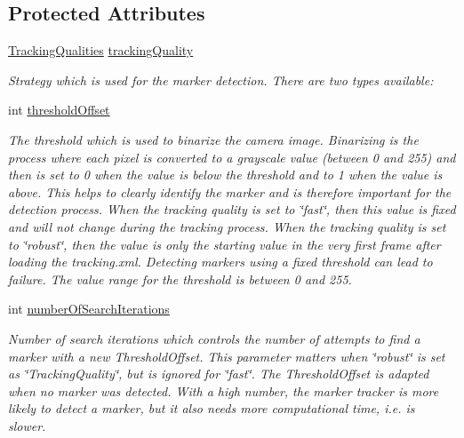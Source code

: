 \subsection*{Protected Attributes}
\begin{DoxyCompactItemize}
\item 
\hyperlink{class_a_rdev_kit_1_1_model_1_1_project_1_1_marker_sensor_adf403b5a2cee12e9f0006bd431cf569f}{Tracking\-Qualities} \hyperlink{class_a_rdev_kit_1_1_model_1_1_project_1_1_marker_sensor_af392037ccf5a8cf5e95ce42b0c768483}{tracking\-Quality}
\begin{DoxyCompactList}\small\item\em Strategy which is used for the marker detection. There are two types available\-: \end{DoxyCompactList}\item 
int \hyperlink{class_a_rdev_kit_1_1_model_1_1_project_1_1_marker_sensor_ad80a6fc2821f265fc4c0583d0a66dfa7}{threshold\-Offset}
\begin{DoxyCompactList}\small\item\em The threshold which is used to binarize the camera image. Binarizing is the process where each pixel is converted to a grayscale value (between 0 and 255) and then is set to 0 when the value is below the threshold and to 1 when the value is above. This helps to clearly identify the marker and is therefore important for the detection process. When the tracking quality is set to \char`\"{}fast\char`\"{}, then this value is fixed and will not change during the tracking process. When the tracking quality is set to \char`\"{}robust\char`\"{}, then the value is only the starting value in the very first frame after loading the tracking.\-xml. Detecting markers using a fixed threshold can lead to failure. The value range for the threshold is between 0 and 255. \end{DoxyCompactList}\item 
int \hyperlink{class_a_rdev_kit_1_1_model_1_1_project_1_1_marker_sensor_aaefe31873d64fdae7c9518487f0ad0d1}{number\-Of\-Search\-Iterations}
\begin{DoxyCompactList}\small\item\em Number of search iterations which controls the number of attempts to find a marker with a new Threshold\-Offset. This parameter matters when \char`\"{}robust\char`\"{} is set as \char`\"{}\-Tracking\-Quality\char`\"{}, but is ignored for \char`\"{}fast\char`\"{}. The Threshold\-Offset is adapted when no marker was detected. With a high number, the marker tracker is more likely to detect a marker, but it also needs more computational time, i.\-e. is slower. \end{DoxyCompactList}\end{DoxyCompactItemize}
